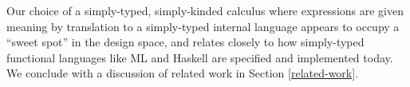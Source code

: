 \documentclass{llncs}
\begin{document}
Our choice of a simply-typed, simply-kinded calculus where expressions are given meaning by translation to a simply-typed internal language appears to occupy a ``sweet spot'' in the design space, and relates closely to how simply-typed functional languages like  ML and Haskell are specified and implemented today. 
We conclude with a discussion of related work in Section \ref{related-work}.




\end{document}

